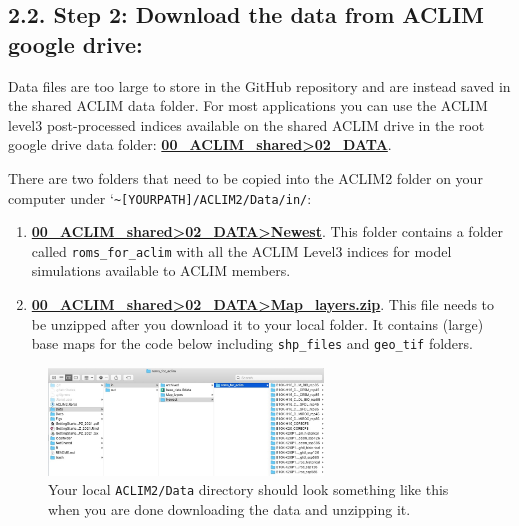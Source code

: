 \documentclass[
]{article}
\begin{document}
\hypertarget{step-2-download-the-data-from-aclim-google-drive}{%
\subsection{2.2. Step 2: Download the data from ACLIM google
drive:}\label{step-2-download-the-data-from-aclim-google-drive}}

Data files are too large to store in the GitHub repository and are
instead saved in the shared ACLIM data folder. For most applications you
can use the ACLIM level3 post-processed indices available on the shared
ACLIM drive in the root google drive data folder:
\href{https://drive.google.com/drive/u/0/folders/0Bx7wdZllbuF9eDJndkhCS2EwQUk}{\textbf{00\_ACLIM\_shared\textgreater02\_DATA}}.

There are two folders that need to be copied into the ACLIM2 folder on
your computer under
`\texttt{\textasciitilde{}{[}YOURPATH{]}/ACLIM2/Data/in/}:

\begin{enumerate}
\def\labelenumi{\arabic{enumi})}
\item
  \href{https://drive.google.com/drive/u/0/folders/0Bx7wdZllbuF9eDJndkhCS2EwQUk}{\textbf{00\_ACLIM\_shared\textgreater02\_DATA\textgreater Newest}}.
  This folder contains a folder called \texttt{roms\_for\_aclim} with
  all the ACLIM Level3 indices for model simulations available to ACLIM
  members.
\item
  \href{https://drive.google.com/drive/u/0/folders/0Bx7wdZllbuF9eDJndkhCS2EwQUk}{\textbf{00\_ACLIM\_shared\textgreater02\_DATA\textgreater Map\_layers.zip}}.
  This file needs to be unzipped after you download it to your local
  folder. It contains (large) base maps for the code below including
  \texttt{shp\_files} and \texttt{geo\_tif} folders.
\end{enumerate}

\begin{figure}
\centering
\includegraphics[width=0.65\textwidth,height=\textheight]{Figs/data_dir.jpg}
\caption{Your local \texttt{ACLIM2/Data} directory should look something
like this when you are done downloading the data and unzipping it.}
\end{figure}
\end{document}
